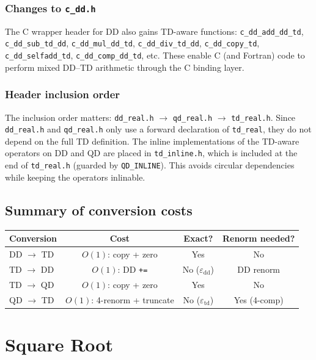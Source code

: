 \documentclass[11pt,a4paper]{article}
\begin{document}
\subsubsection{Changes to \texttt{c\_dd.h}}

The C wrapper header for DD also gains TD-aware functions:
\texttt{c\_dd\_add\_dd\_td}, \texttt{c\_dd\_sub\_td\_dd},
\texttt{c\_dd\_mul\_dd\_td}, \texttt{c\_dd\_div\_td\_dd},
\texttt{c\_dd\_copy\_td}, \texttt{c\_dd\_selfadd\_td},
\texttt{c\_dd\_comp\_dd\_td}, etc.  These enable C (and Fortran)
code to perform mixed DD--TD arithmetic through the C binding layer.

\subsubsection{Header inclusion order}

The inclusion order matters:
\texttt{dd\_real.h} $\to$ \texttt{qd\_real.h} $\to$
\texttt{td\_real.h}.  Since \texttt{dd\_real.h} and
\texttt{qd\_real.h} only use a forward declaration of
\texttt{td\_real}, they do not depend on the full TD definition.
The inline implementations of the TD-aware operators on DD and QD
are placed in \texttt{td\_inline.h}, which is included at the end
of \texttt{td\_real.h} (guarded by \texttt{QD\_INLINE}).  This
avoids circular dependencies while keeping the operators inlinable.

\subsection{Summary of conversion costs}

\begin{center}
\begin{tabular}{lccc}
\toprule
Conversion & Cost & Exact? & Renorm needed? \\
\midrule
DD $\to$ TD & $O(1)$: copy + zero & Yes & No \\
TD $\to$ DD & $O(1)$: DD \texttt{+=} & No ($\varepsilon_{\mathrm{dd}}$) & DD renorm \\
TD $\to$ QD & $O(1)$: copy + zero & Yes & No \\
QD $\to$ TD & $O(1)$: 4-renorm + truncate & No ($\varepsilon_{\mathrm{td}}$) & Yes (4-comp) \\
\bottomrule
\end{tabular}
\end{center}


\section{Square Root}
\label{sec:sqrt}
\end{document}
